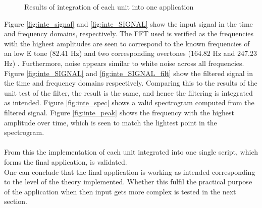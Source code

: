 \begin{figure}[H]
\begin{subfigure}{0.49\textwidth}
\end{subfigure}
\caption{Results of integration of each unit into one application }
\label{fig:inte_validation}
\end{figure}
Figure \ref{fig:inte_signal} and \ref{fig:inte_SIGNAL} show the input signal in the time and frequency domains, respectively. The FFT used is verified as the frequencies with the highest amplitudes are seen to correspond to the known frequencies of an low E tone (82.41 Hz) and two corresponding overtones (164.82 Hz and 247.23 Hz) . Furthermore, noise appears similar to white noise across all frequencies.\\
Figure \ref{fig:inte_SIGNAL} and \ref{fig:inte_SIGNAL_filt} show the filtered signal in the time and frequency domains respectively. Comparing this to the results of the unit test of the filter, the result is the same, and hence the filtering is integrated as intended. Figure \ref{fig:inte_spec} shows a valid spectrogram computed from the filtered signal. Figure \ref{fig:inte_peak} shows the frequency with the highest amplitude over time, which is seen to match the lightest point in the spectrogram. \\
\\
From this the implementation of each unit integrated into one single script, which forms the final application, is validated. \\
One can conclude that the final application is working as intended corresponding to the level of the theory implemented. Whether this fulfil the practical purpose of the application when then input gets more complex is tested in the next section.